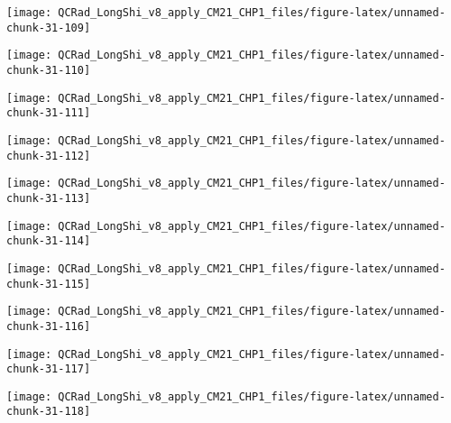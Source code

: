 \documentclass[
  10pt,
  a4paper,oneside]{article}
\begin{document}
\begin{center}\texttt{[image: QCRad\_LongShi\_v8\_apply\_CM21\_CHP1\_files/figure-latex/unnamed-chunk-31-109]} \end{center}

\begin{center}\texttt{[image: QCRad\_LongShi\_v8\_apply\_CM21\_CHP1\_files/figure-latex/unnamed-chunk-31-110]} \end{center}

\begin{center}\texttt{[image: QCRad\_LongShi\_v8\_apply\_CM21\_CHP1\_files/figure-latex/unnamed-chunk-31-111]} \end{center}

\begin{center}\texttt{[image: QCRad\_LongShi\_v8\_apply\_CM21\_CHP1\_files/figure-latex/unnamed-chunk-31-112]} \end{center}

\begin{center}\texttt{[image: QCRad\_LongShi\_v8\_apply\_CM21\_CHP1\_files/figure-latex/unnamed-chunk-31-113]} \end{center}

\begin{center}\texttt{[image: QCRad\_LongShi\_v8\_apply\_CM21\_CHP1\_files/figure-latex/unnamed-chunk-31-114]} \end{center}

\begin{center}\texttt{[image: QCRad\_LongShi\_v8\_apply\_CM21\_CHP1\_files/figure-latex/unnamed-chunk-31-115]} \end{center}

\begin{center}\texttt{[image: QCRad\_LongShi\_v8\_apply\_CM21\_CHP1\_files/figure-latex/unnamed-chunk-31-116]} \end{center}

\begin{center}\texttt{[image: QCRad\_LongShi\_v8\_apply\_CM21\_CHP1\_files/figure-latex/unnamed-chunk-31-117]} \end{center}

\begin{center}\texttt{[image: QCRad\_LongShi\_v8\_apply\_CM21\_CHP1\_files/figure-latex/unnamed-chunk-31-118]} \end{center}
\end{document}
